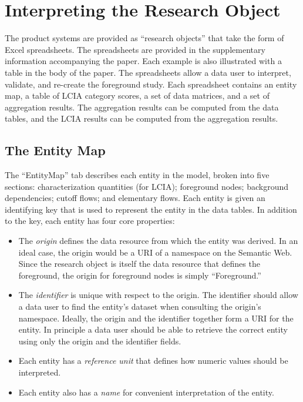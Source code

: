 \section{Interpreting the Research Object}

The product systems are provided as ``research objects'' that take the form of Excel spreadsheets.  The spreadsheets are provided in the supplementary information accompanying the paper.  Each example is also illustrated with a table in the body of the paper.
The spreadsheets allow a data user to interpret, validate, and re-create the foreground study.  Each spreadsheet contains an entity map, a table of LCIA category scores, a set of data matrices, and a set of aggregation results.  The aggregation results can be computed from the data tables, and the LCIA results can be computed from the aggregation results.  

\subsection{The Entity Map}

The ``EntityMap'' tab describes each entity in the model, broken into five sections: characterization quantities (for LCIA); foreground nodes; background dependencies; cutoff flows; and elementary flows.  Each entity is given an identifying key that is used to represent the entity in the data tables.  In addition to the key, each entity has four core properties:
\begin{itemize}
\item The \emph{origin} defines the data resource from which the entity was derived.  In an ideal case, the origin would be a URI of a namespace on the Semantic Web.  Since the research object is itself the data resource that defines the foreground, the origin for foreground nodes is simply ``Foreground.''
\item The \emph{identifier} is unique with respect to the origin.  The identifier should allow a data user to find the entity's dataset when consulting the origin's namespace. Ideally, the origin and the identifier together form a URI for the entity.   In principle a data user should be able to retrieve the correct entity using only the origin and the identifier fields.
\item Each entity has a \emph{reference unit} that defines how numeric values should be interpreted.
\item Each entity also has a \emph{name} for convenient interpretation of the entity.  
\end{itemize}


